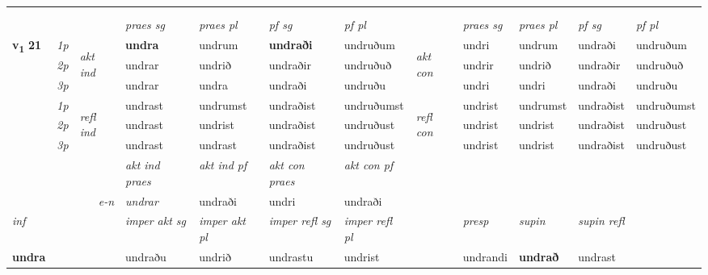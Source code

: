 \begin{longtable}[l]{X>{\footnotesize\itshape}llXXXXlXXXX}
& \\*
& \\
\midrule
 & &   & \textit{praes sg}  & \textit{praes pl}    & \textit{ pf sg} & \textit{pf pl} & & \textit{praes sg}  & \textit{praes pl}    & \textit{pf sg} & \textit{pf pl }  \\ \cmidrule{4-7} \cmidrule{9-12}
 \multirow{2}{*}{{{\textbf{v{\textsubscript{1}}} \Large{\textbf{21}}}}}  & 1p & \multirow{3}{*}{\begin{turn}{90}\textit{akt ind}\end{turn}} & \textbf{undra} & undrum & \textbf{undraði} & undruðum & \multirow{3}{*}{\begin{turn}{90}\textit{akt con}\end{turn}} &undri & undrum & undraði & undruðum\\*
 & 2p &  &  undrar  & undrið & undraðir & undruðuð & & undrir & undrið & undraðir & undruðuð \\*
 & 3p &  & undrar & undra & undraði & undruðu & & undri & undri& undraði & undruðu \\*
\cmidrule{4-7} \cmidrule{9-12}
 & 1p & \multirow{3}{*}{\begin{turn}{90}\textit{refl ind}\end{turn}}  & undrast & undrumst & undraðist & undruðumst & \multirow{3}{*}{\begin{turn}{90}\textit{refl con}\end{turn}}  &undrist & undrumst & undraðist & undruðumst \\*
 & 2p &  & undrast & undrist & undraðist & undruðust & &undrist & undrist & undraðist & undruðust \\*
 & 3p  & & undrast & undrast & undraðist & undruðust & & undrist & undrist& undraðist & undruðust \\*
\cmidrule{4-7} \cmidrule{9-12}

   && &  \textit{akt ind praes} & \textit{akt ind pf} & \textit{akt con praes} & \textit{akt con pf} \\*
\multicolumn{3}{r}{\textit{e-n}} & undrar & undraði & undri & undraði \\*

\cmidrule{4-7}
   {\textit{inf}} & &  & \textit{imper akt sg} & \textit{imper akt pl} & \textit{imper refl sg} & \textit{imper refl pl} && \textit{presp} & \textit{supin} & \textit{supin refl}  \\*
  {\textbf{undra}} & && undraðu  & undrið & undrastu & undrist && undrandi &  \textbf{undrað} & undrast  \\*


\end{longtable}
